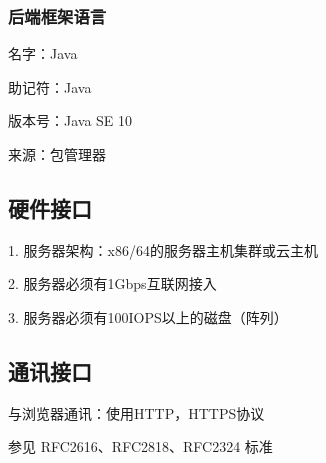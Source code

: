 \subsubsection{后端框架语言}

名字：Java

助记符：Java

版本号：Java SE 10

来源：包管理器 

\subsection{硬件接口}

1. 服务器架构：x86/64的服务器主机集群或云主机

2. 服务器必须有1Gbps互联网接入

3. 服务器必须有100IOPS以上的磁盘（阵列）

\subsection{通讯接口}

与浏览器通讯：使用HTTP，HTTPS协议

参见 RFC2616、RFC2818、RFC2324 标准



